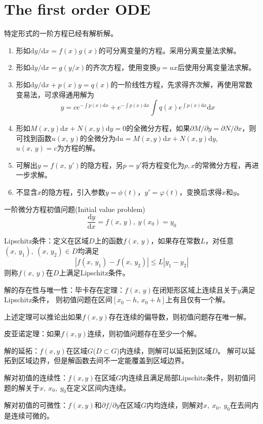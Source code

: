 \chapter{The first order ODE}

特定形式的一阶方程已经有解析解。
\begin{enumerate}
    \item 形如$\mathrm{d}y/\mathrm{d}x=f(x)g(x)$的可分离变量的方程。采用分离变量法求解。
    \item 形如$\mathrm{d}y/\mathrm{d}x=g(y/x)$的齐次方程，使用变换$y=ux$后使用分离变量法求解。
    \item 形如$\mathrm{d}y/\mathrm{d}x + p(x)y = q(x)$的一阶线性方程，先求得齐次解，再使用常数变易法，可求得通用解为\begin{equation}
        y=ce^{-\int p(x)\mathrm{d}x} + e^{-\int p(x)\mathrm{d}x}\int q(x) e^{\int p(x)\mathrm{d}x}\mathrm{d}x
    \end{equation}
    \item 形如$M(x,y)\mathrm{d}x + N(x,y)\mathrm{d}y = 0$的全微分方程，如果$\partial M/\partial y = \partial N/\partial x$，则可找到函数$u(x,\,y)$的全微分为$\mathrm{d}u = M(x,y)\mathrm{d}x + N(x,y)\mathrm{d}y$, $u(x,\,y)=c$为方程的解。
    \item 可解出$y=f(x,\,y')$的隐方程，另$p=y'$将方程变化为$p,x$的常微分方程，再进一步求解。
    \item 不显含$x$的隐方程，引入参数$y=\phi(t)$，$y'=\varphi(t)$，变换后求得$x$和$y$。
\end{enumerate}

一阶微分方程初值问题(Initial value problem)
\begin{equation}
    \frac{\mathrm{d}y}{\mathrm{d}x}=f(x,\,y),\ y(x_{0})=y_{0}
\end{equation}

Lipschitz条件：定义在区域$D$上的函数$f(x,\,y)$，如果存在常数$L$，对任意$(x,\,y_{1}),\ (x,\,y_{2}) \in D$均满足
\begin{equation}
    |f(x,\,y_{1}) - f(x,\,y_{2}) | \le L| y_{1}-y_{2} |
\end{equation}
则称$f(x,\,y)$在$D$上满足Lipschitz条件。

解的存在性与唯一性：毕卡存在定理：$f(x,\,y)$在闭矩形区域上连续且关于$y$满足Lipschitz条件，
则初值问题在区间$\left[ x_{0}-h,\,x_{0}+h \right]$上有且仅有一个解。

上述定理可以推论出如果$f(x,y)$存在连续的偏导数，则初值问题存在唯一解。

皮亚诺定理：如果$f(x,y)$连续，则初值问题存在至少一个解。

解的延拓：$f(x,y)$在区域$G$($D \subset G$)内连续，则解可以延拓到区域$D$。
解可以延拓到区域边界，但是解函数去间不一定能覆盖到区域边界。

解对初值的连续性：$f(x,y)$在区域$G$内连续且满足局部Lipschitz条件，则初值问题的解关于$x,\ x_{0},\ y_{0}$在定义区间内连续。

解对初值的可微性：$f(x,y)$和$\partial f/\partial y$在区域$G$内均连续，则解对$x,\ x_{0},\ y_{0}$在去间内是连续可微的。
